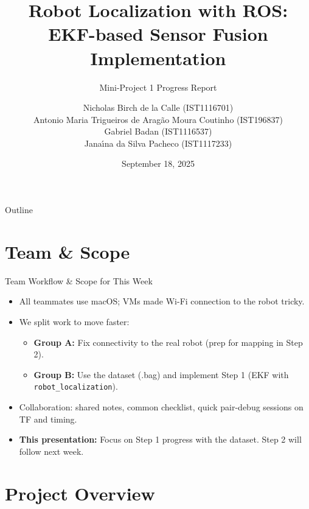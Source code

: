 \documentclass[10pt]{beamer}
\title[Robot Localization with ROS]{\texorpdfstring{Robot Localization with ROS: \\EKF-based Sensor Fusion Implementation}{Robot Localization with ROS: EKF-based Sensor Fusion Implementation}}
\subtitle{Mini-Project 1 Progress Report}
\author{Nicholas Birch de la Calle (IST1116701) \\
Antonio Maria Trigueiros de Arag\~{a}o Moura Coutinho (IST196837) \\
Gabriel Badan (IST1116537) \\
Jana\'{\i}na da Silva Pacheco (IST1117233)}
\institute{Instituto Superior Técnico}
\date{September 18, 2025}
\begin{document}
\begin{frame}
\titlepage
\end{frame}

\begin{frame}{Outline}
\tableofcontents
\end{frame}

\section{Team \& Scope}

\begin{frame}{Team Workflow \& Scope for This Week}
\begin{itemize}
    \item All teammates use macOS; VMs made Wi-Fi connection to the robot tricky.
    \item We split work to move faster:
    \begin{itemize}
        \item \textbf{Group A:} Fix connectivity to the real robot (prep for mapping in Step 2).
        \item \textbf{Group B:} Use the dataset (.bag) and implement Step 1 (EKF with \texttt{robot\_localization}).
    \end{itemize}
    \item Collaboration: shared notes, common checklist, quick pair-debug sessions on TF and timing.
    \item \textbf{This presentation:} Focus on Step 1 progress with the dataset. Step 2 will follow next week.
\end{itemize}
\end{frame}

\section{Project Overview}
\end{document}
